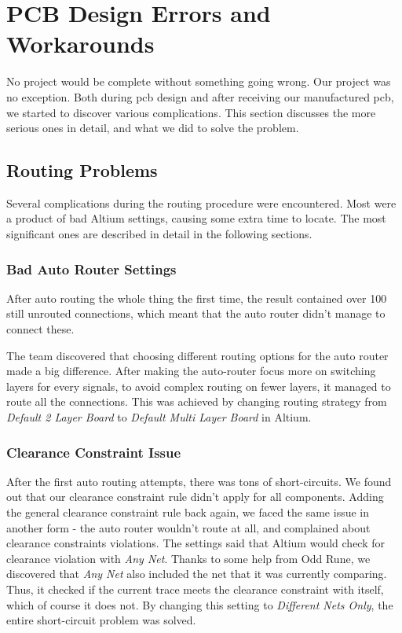 \section{PCB Design Errors and Workarounds}
No project would be complete without something going wrong. Our project was no exception. Both during \gls{pcb} design and after receiving our manufactured \gls{pcb}, we started to discover various complications. This section discusses the more serious ones in detail, and what we did to solve the problem.

\subsection{Routing Problems}
\label{Routing Problems}
Several complications during the routing procedure were encountered. 
Most were a product of bad Altium settings, causing some extra time to locate.
The most significant ones are described in detail in the following sections.

\subsubsection{Bad Auto Router Settings}
After auto routing the whole thing the first time, the result contained over 100 still unrouted connections, which meant that the auto router didn't manage to connect these.

The team discovered that choosing different routing options for the auto router made a big difference. 
After making the auto-router focus more on switching layers for every signals, to avoid complex routing on fewer layers, it managed to route all the connections. This was achieved by changing routing strategy from \emph{Default 2 Layer Board} to \emph{Default Multi Layer Board} in Altium.

\subsubsection{Clearance Constraint Issue}
After the first auto routing attempts, there was tons of short-circuits. We found out that our clearance constraint rule didn't apply for all components.
Adding the general clearance constraint rule back again, we faced the same issue in another form - the auto router wouldn't route at all, and complained about clearance constraints violations.
The settings said that Altium would check for clearance violation with \emph{Any Net}. Thanks to some help from Odd Rune, we discovered that \emph{Any Net} also included the net that it was currently comparing. Thus, it checked if the current trace meets the clearance constraint with itself, which of course it does not. By changing this setting to \emph{Different Nets Only}, the entire short-circuit problem was solved. 

